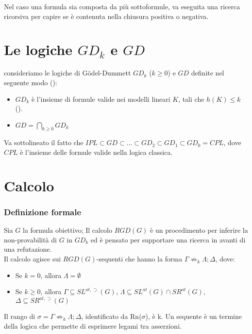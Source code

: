 \documentclass[\main/tesi.tex]{subfiles}
\begin{document}
Nel caso una formula sia composta da più sottoformule, va eseguita una ricerca ricorsiva per capire se è contenuta nella chiusura positiva o negativa. \\

\section{Le logiche $GD_k$ e $GD$}

consideriamo le logiche di G\"odel-Dummett $GD_k$ ($k \geq 0$) e $GD$ definite nel seguente modo (\cite{ChaZak:97}):
\begin{itemize}
    \item $GD_k$ è l'insieme di formule valide nei modelli lineari $K$, tali che $h(K) \leq k$ (\cite[p.~2--3]{DBLP:conf/cilc/Fiorentini022}).
    \item $GD = \bigcap_{k \geq 0}GD_k$
\end{itemize}
Va sottolineato il fatto che $IPL \subset GD \subset \dots \subset GD_2 \subset GD_1 \subset GD_0 = CPL$, dove $CPL$ è l'insieme delle formule valide nella logica classica.

\section{Calcolo}

\subsubsection{Definizione formale}
Sia $G$ la formula obiettivo; Il calcolo $RGD(G)$ è un procedimento per inferire la non-provabilità di $G$ in $GD_k$ ed è pensato per supportare una ricerca in avanti di una refutazione.\\
Il calcolo agisce sui $RGD(G)$-sequenti che hanno la forma $\Gamma \not\Rightarrow_k \Lambda; \Delta$, dove:
\begin{itemize}
    \item Se $k = 0$, allora $\Lambda = \emptyset$
    \item Se $k \geq 0$, allora $\Gamma \subseteq SL^{at,\supset}(G)$, $\Lambda \subseteq SL^{at}(G) \cap SR^{at}(G)$, $\Delta \subseteq SR^{at,\supset}(G)$
\end{itemize}
Il rango di $\sigma = \Gamma \not\Rightarrow_k \Lambda; \Delta$, identificato da Rn($\sigma$), è k. Un sequente è un termine della logica che permette di esprimere legami tra asserzioni.
\end{document}
